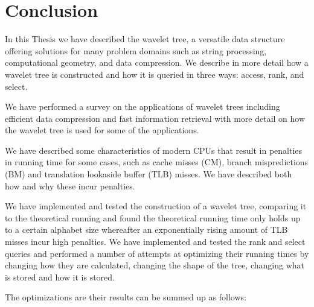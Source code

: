 \section{Conclusion}
In this Thesis we have described the wavelet tree, a versatile data structure offering solutions for many problem domains such as string processing, computational geometry, and data compression.
We describe in more detail how a wavelet tree is constructed and how it is queried in three ways: access, rank, and select.

We have performed a survey on the applications of wavelet trees including efficient data compression and fast information retrieval with more detail on how the wavelet tree is used for some of the applications.

We have described some characteristics of modern CPUs that result in penalties in running time for some cases, such as cache misses (CM), branch mispredictions (BM) and translation lookaside buffer (TLB) misses.
We have described both how and why these incur penalties.

We have implemented and tested the construction of a wavelet tree, comparing it to the theoretical running and found the theoretical running time only holds up to a certain alphabet size whereafter an exponentially rising amount of TLB misses incur high penalties.
We have implemented and tested the rank and select queries and performed a number of attempts at optimizing their running times by changing how they are calculated, changing the shape of the tree, changing what is stored and how it is stored.

The optimizations are their results can be summed up as follows:

